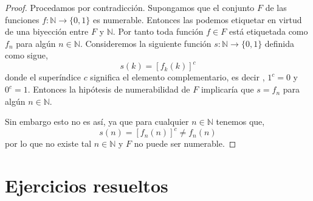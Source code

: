 \documentclass[12pt]{book}
\def\NN{\mathbb{N}}
\begin{document}
\begin{proof}
Procedamos por contradicción. Supongamos  que el conjunto $F$ de las funciones $f:
\NN\longrightarrow\{0,1\}$ es numerable. Entonces las podemos etiquetar en virtud de una 
biyección entre $F$ y $\NN$. Por tanto toda función $f\in F$ está etiquetada como $f_n$ para 
algún $n\in \NN$. Consideremos la siguiente función $s:\NN\longrightarrow \{0,1\}$ definida como 
sigue,
$$s(k) = [f_k(k)]^c$$
donde   el superíndice $c$  significa el elemento complementario, es decir , $1^c=0$ y $0^c=1$. 
Entonces la hipótesis de numerabilidad de $F$ implicaría que $s=f_n$ para algún $n\in \NN$.

Sin embargo esto no es así, ya que para cualquier $n\in \NN$ tenemos que,
$$s(n)=[f_n(n)]^c  \not= f_n(n)$$ 
por lo que no existe tal $n\in \NN$ y $F$ no puede ser numerable.
\end{proof}

\section{Ejercicios resueltos}
\end{document}
